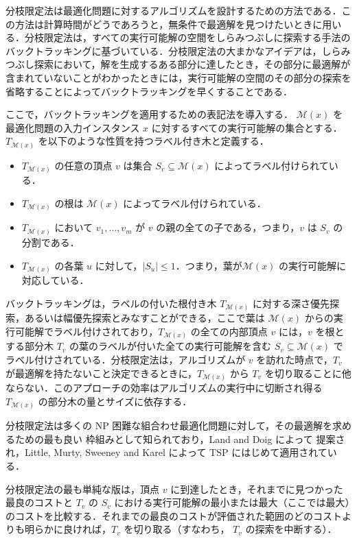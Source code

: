 \documentclass[12pt]{optlab-bachelor}
\begin{document}
分枝限定法は最適化問題に対するアルゴリズムを設計するための方法である．この方法は計算時間がどうであろうと，無条件で最適解を見つけたいときに用いる．分枝限定法は，すべての実行可能解の空間をしらみつぶしに探索する手法のバックトラッキングに基づいている．分枝限定法の大まかなアイデアは，しらみつぶし探索において，解を生成するある部分に達したとき，その部分に最適解が含まれていないことがわかったときには，実行可能解の空間のその部分の探索を省略することによってバックトラッキングを早くすることである．

ここで，バックトラッキングを適用するための表記法を導入する．
$\mathcal{M}(x)$ を最適化問題の入力インスタンス $x$ に対するすべての実行可能解の集合とする．$T_{\mathcal{M}(x)}$ を以下のような性質を持つラベル付き木と定義する．
\begin{itemize}
  \item $T_{\mathcal{M}(x)}$ の任意の頂点 $v$ は集合 $S_v \subseteq \mathcal{M}(x)$ によってラベル付けられている．
  \item $T_{\mathcal{M}(x)}$ の根は $\mathcal{M}(x)$ によってラベル付けられている．
  \item $T_{\mathcal{M}(x)}$ において $v_1,\ldots,v_m$ が $v$ の親の全ての子である，つまり，$v$ は $S_v$ の分割である．
  \item $T_{\mathcal{M}(x)}$ の各葉 $u$ に対して，$|S_u| \le 1$．つまり，葉が$\mathcal{M}(x)$ の実行可能解に対応している．
\end{itemize}

バックトラッキングは，ラベルの付いた根付き木 $T_{\mathcal{M}(x)}$ に対する深さ優先探索，あるいは幅優先探索とみなすことができる，ここで葉は $\mathcal{M}(x)$ からの実行可能解でラベル付けされており，$T_{\mathcal{M}(x)}$ の全ての内部頂点 $v$ には，$v$ を根とする部分木 $T_v$ の葉のラベルが付いた全ての実行可能解を含む $S_v \subseteq \mathcal{M}(x)$ でラベル付けされている．分枝限定法は，アルゴリズムが $v$ を訪れた時点で，$T_v$ が最適解を持たないこと決定できるときに，$T_{\mathcal{M}(x)}$ から $T_v$ を切り取ることに他ならない．このアプローチの効率はアルゴリズムの実行中に切断され得る $T_{\mathcal{M}(x)}$ の部分木の量とサイズに依存する．

分枝限定法は多くの NP 困難な組合わせ最適化問題に対して，その最適解を求めるための最も良い
枠組みとして知られており，Land and Doig \cite{BandB} によって
提案され，Little, Murty, Sweeney and Karel \cite{BandB2}
によって TSP にはじめて適用されている．

分枝限定法の最も単純な版は，頂点 $v$ に到達したとき，それまでに見つかった最良のコストと $T_v$
の $S_v$ における実行可能解の最小または最大（ここでは最大）のコストを比較する．それまでの最良のコストが評価された範囲のどのコストよりも明らかに良ければ，$T_v$ を切り取る（すなわち， $T_v$ の探索を中断する）．
\end{document}
